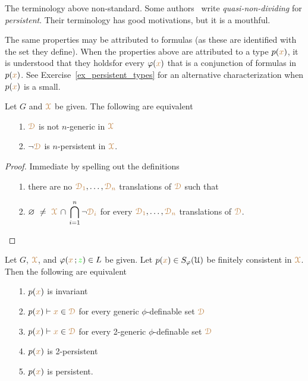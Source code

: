 \noindent\llap{\textcolor{red}{\Large\warning}\kern1.5ex}\ignorespaces
The terminology above non-standard.
Some authors~\cite{CK} write \textit{quasi-non-dividing\/} for \textit{persistent}.
Their terminology has good motivations, but it is a mouthful.

The same properties may be attributed to formulas (as these are identified with the set they define).
When the properties above are attributed to a type $p({\color{brown} x})$, it is understood that they holdsfor every $\varphi({\color{brown} x})$ that is a conjunction of formulas in $p({\color{brown} x})$.
See Exercise~\ref{ex_persistent_types} for an alternative characterization when $p({\color{brown} x})$ is a small.

\begin{fact}\label{fact_fip}
  Let $G$ and ${\color{brown}\EuScript X}$ be given.
  The following are equivalent
  \begin{itemize}
    \item[1.] ${\color{brown}\EuScript D}$ is not $n$-generic in ${\color{brown}\EuScript X}$
    \item[2.] $\neg{\color{brown}\EuScript D}$ is $n$-persistent in ${\color{brown}\EuScript X}$.
  \end{itemize}
\end{fact}

\begin{proof}
  Immediate by spelling out the definitions\smallskip
  \begin{itemize}
    \item[1.] there are no ${\color{brown}\EuScript D_1},\dots,{\color{brown}\EuScript D_n}$ translations of ${\color{brown}\EuScript D}$ such that 
    \item[2.]  $\displaystyle\0\ \neq\ \mrX\,\cap\,\bigcap_{i=1}^n\neg{\mr\D_i}$ for every ${\color{brown}\EuScript D_1},\dots,{\color{brown}\EuScript D_n}$ translations of ${\color{brown}\EuScript D}$.\qedhere
  \end{itemize} 
\end{proof}

\begin{theorem}\label{thm_generic_invariant}
  Let $G$,  ${\color{brown}\EuScript X}$, and $\varphi({\color{brown} x}\,;{\color{green} z})\in L$ be given.
  Let $p({\color{brown} x})\in S_\varphi(\EuScript U)$ be finitely consistent in ${\color{brown}\EuScript X}$.
  Then the following are equivalent
  \begin{itemize}
    \item[1.] $p({\color{brown} x})$ is invariant
    \item[2.] $p({\color{brown} x})\vdash{\color{brown}x}\in{\color{brown}\EuScript D}$ for every generic $\phi$-definable set ${\color{brown}\EuScript D}$
    \item[3.] $p({\color{brown} x})\vdash{\color{brown}x}\in{\color{brown}\EuScript D}$ for every 2-generic $\phi$-definable set ${\color{brown}\EuScript D}$
    \item[4.] $p({\color{brown} x})$ is 2-persistent
    \item[5.] $p({\color{brown} x})$ is persistent.
  \end{itemize}
\end{theorem}

